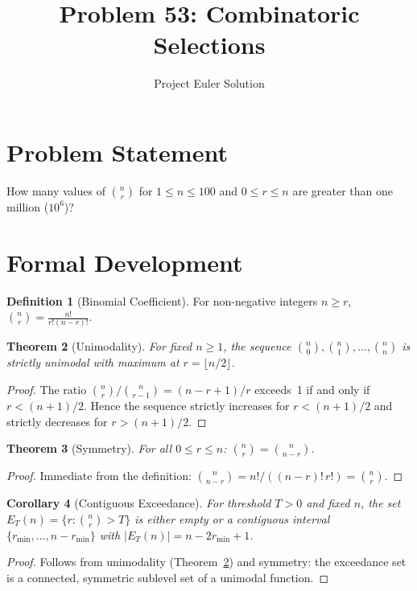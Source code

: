 \documentclass[12pt]{article}
\title{Problem 53: Combinatoric Selections}
\author{Project Euler Solution}
\date{}
\newtheorem{theorem}{Theorem}
\newtheorem{corollary}[theorem]{Corollary}
\theoremstyle{definition}
\newtheorem{definition}[theorem]{Definition}
\begin{document}
\maketitle

\section{Problem Statement}
How many values of $\binom{n}{r}$ for $1 \leq n \leq 100$ and $0 \leq r \leq n$ are greater than one million ($10^6$)?

\section{Formal Development}

\begin{definition}[Binomial Coefficient]
For non-negative integers $n \geq r$, $\binom{n}{r} = \frac{n!}{r!(n-r)!}$.
\end{definition}

\begin{theorem}[Unimodality]
\label{thm:unimodal}
For fixed $n \geq 1$, the sequence $\binom{n}{0}, \binom{n}{1}, \ldots, \binom{n}{n}$ is strictly unimodal with maximum at $r = \lfloor n/2 \rfloor$.
\end{theorem}

\begin{proof}
The ratio $\binom{n}{r}/\binom{n}{r-1} = (n - r + 1)/r$ exceeds~1 if and only if $r < (n+1)/2$. Hence the sequence strictly increases for $r < (n+1)/2$ and strictly decreases for $r > (n+1)/2$.
\end{proof}

\begin{theorem}[Symmetry]
For all $0 \leq r \leq n$: $\binom{n}{r} = \binom{n}{n-r}$.
\end{theorem}

\begin{proof}
Immediate from the definition: $\binom{n}{n-r} = n!/((n-r)!\,r!) = \binom{n}{r}$.
\end{proof}

\begin{corollary}[Contiguous Exceedance]
\label{cor:contiguous}
For threshold $T > 0$ and fixed $n$, the set $E_T(n) = \{r : \binom{n}{r} > T\}$ is either empty or a contiguous interval $\{r_{\min}, \ldots, n - r_{\min}\}$ with $|E_T(n)| = n - 2r_{\min} + 1$.
\end{corollary}

\begin{proof}
Follows from unimodality (Theorem~\ref{thm:unimodal}) and symmetry: the exceedance set is a connected, symmetric sublevel set of a unimodal function.
\end{proof}
\end{document}
